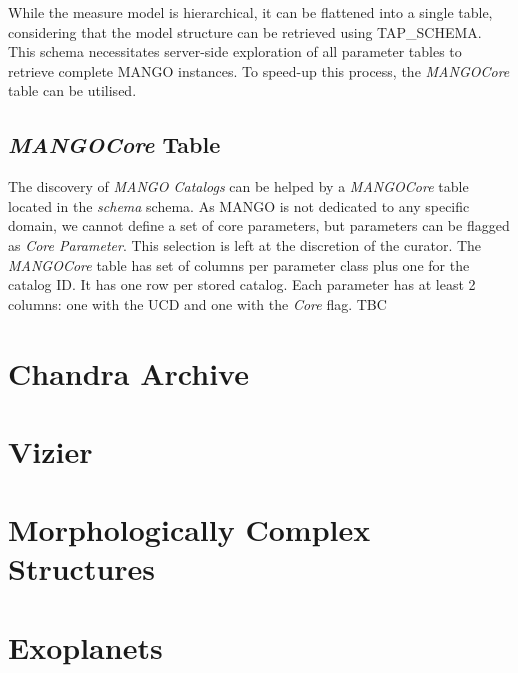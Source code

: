 \documentclass[11pt,a4paper]{ivoa}
\begin{document}
While the measure model is hierarchical, it can be flattened into a single table,
considering that the model structure can be retrieved using TAP\_SCHEMA.
This schema necessitates server-side exploration of all parameter tables
to retrieve complete MANGO instances.
To speed-up this process, the \emph{MANGOCore} table can be utilised.

\subsection{ \emph{MANGOCore} Table}

The discovery of \emph{MANGO Catalogs} can be helped by a  \emph{MANGOCore} table located in the  \emph{schema} schema. As MANGO is not dedicated to any specific domain, we cannot define a set of core parameters, but parameters can be flagged as \emph{Core Parameter}.
This selection is left at the discretion of the curator.
The \emph{MANGOCore} table has set of columns per parameter class plus one for the catalog ID.
It has one row per stored catalog. Each parameter has at least 2 columns: one with the UCD and one with the \emph{Core} flag. TBC


\appendix

% 

% 

\section{Chandra Archive}
\label{sec:chandra} 


\section{Vizier}


\section{Morphologically Complex Structures}


\section{Exoplanets}

\end{document}
